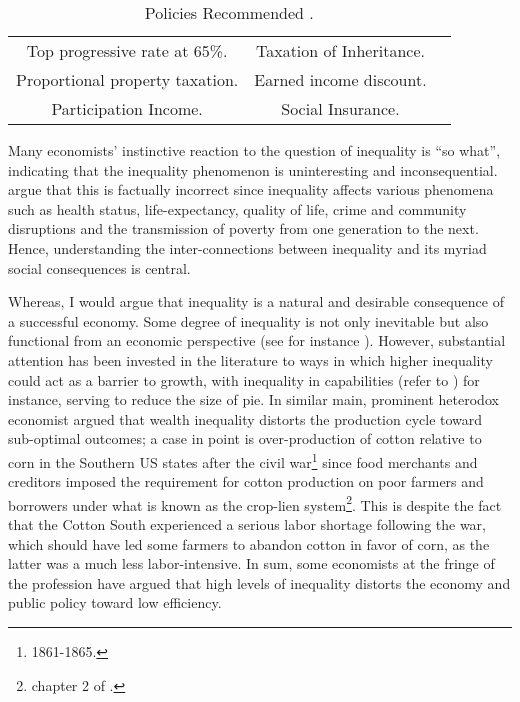\documentclass[12pt]{article}
\newcommand{\1}{\mathbbm 1}
\begin{document}
	\begin{table} [h!]
	\begin{center}
		\begin{tabular}{ |c | c | c | }
			\hline
			Top progressive rate at 65\%. & Taxation of Inheritance. \\
			Proportional property  taxation.  & Earned income discount.\\
			Participation Income. & Social Insurance.\\
			\hline
		\end{tabular}
	\end{center}
\caption{Policies Recommended \cite{atkinson2015inequality}.}
\label {table:1}
\end{table}
	
	
	
	

	
	Many economists' instinctive reaction to the question of inequality is ``so what'', indicating that the inequality phenomenon is uninteresting and inconsequential. \cite{salverda2011oxford} argue that this is factually incorrect since inequality affects various phenomena such as health status, life-expectancy, quality of life, crime and community disruptions and the transmission of poverty from one generation to the next. Hence, understanding the inter-connections between inequality and its myriad social consequences is central. 
	
	
	Whereas, I would argue that inequality is a natural and desirable consequence of a successful economy. Some degree of inequality is not only inevitable but also functional from an economic perspective (see for instance \cite{welch1999defense}). However, substantial attention has been invested in the literature to ways in which higher inequality could act as a barrier to growth, with inequality in capabilities (refer to \cite{sen1995inequality}) for instance, serving to reduce the size of pie. In similar main, prominent heterodox economist \cite{bowles2012new} argued that wealth inequality distorts the production cycle toward sub-optimal outcomes; a case in point is over-production of cotton relative to corn in the Southern US states after the civil war\footnote{1861-1865.} since food merchants and creditors imposed the requirement for cotton production on poor farmers and borrowers under what is known as the crop-lien system\footnote{chapter 2 of \cite{bowles2012new}.}. This is despite the fact that the Cotton South experienced a serious labor shortage following
	the war, which should have led some farmers to abandon cotton in favor of corn, as the latter was a much less labor-intensive. In sum, some economists at the fringe of the profession have argued that high levels of inequality distorts the economy and public policy toward low efficiency.
	
\end{document}
